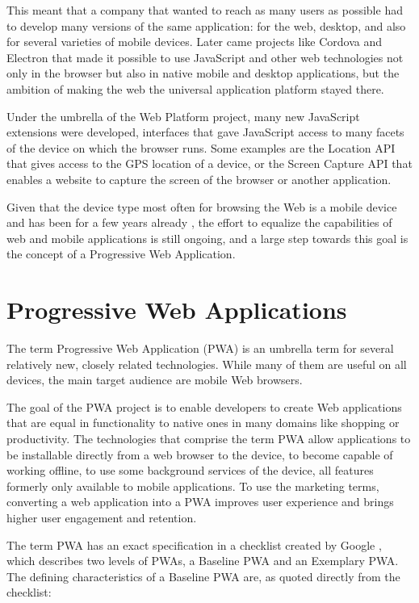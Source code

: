\documentclass[english,odsaz]{fitthesis}
\begin{document}
This meant that a company that wanted to reach as many users as possible had to
develop many versions of the same application: for the web, desktop, and also
for several varieties of mobile devices. Later came projects like Cordova
and Electron that made it possible to use JavaScript and other web technologies
not only in the browser but also in native mobile and desktop applications, but
the ambition of making the web the universal application platform stayed there.

Under the umbrella of the Web Platform project, many new JavaScript extensions
were developed, interfaces that gave JavaScript access to many facets of the
device on which the browser runs. Some examples are the Location API that gives
access to the GPS location of a device, or the Screen Capture API that enables a
website to capture the screen of the browser or another application.

Given that the device type most often for browsing the Web is a mobile device
and has been for a few years already \cite{mobile-stats}, the effort to equalize
the capabilities of web and mobile applications is still ongoing, and a large
step towards this goal is the concept of a Progressive Web Application.

\section{Progressive Web Applications}
\label{sec:org7af6f1b}
The term Progressive Web Application (PWA) is an umbrella term for several
relatively new, closely related technologies. While many of them are useful on
all devices, the main target audience are mobile Web browsers.

The goal of the PWA project is to enable developers to create Web applications
that are equal in functionality to native ones in many domains like shopping or
productivity. The technologies that comprise the term PWA allow applications to
be installable directly from a web browser to the device, to become capable of
working offline, to use some background services of the device, all features
formerly only available to mobile applications. To use the marketing terms,
converting a web application into a PWA improves user experience and brings
higher user engagement and retention.

The term PWA has an exact specification in a checklist created by Google
\cite{pwa_checklist}, which describes two levels of PWAs, a Baseline PWA and an
Exemplary PWA. The defining characteristics of a Baseline PWA are, as quoted
directly from the checklist:
\end{document}

